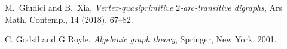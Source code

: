 \documentclass[11pt]{amsart}
\begin{document}
\begin{thebibliography}{}

 M.~Giudici and B.~Xia, \emph{Vertex-quasiprimitive \(2\)-arc-transitive digraphs}, Ars Math. Contemp., 14 (2018), 67--82.

C. Godsil and G Royle, \emph{Algebraic graph theory}, Springer, New York, 2001.














\end{thebibliography}
\end{document}
